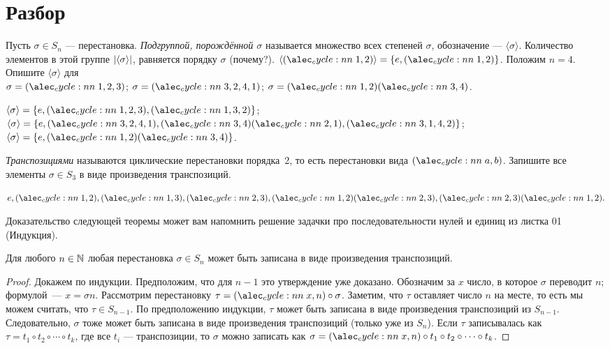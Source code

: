 \documentclass[a4paper,12pt]{article}
\begin{document}
    
    \section{Разбор}
    
     Пусть $\sigma \in S_n$ --- перестановка. \emph{Подгруппой, порождённой $\sigma$} называется множество всех степеней $\sigma$, обозначение --- $\langle\sigma\rangle$. Количество элементов в этой группе $\lvert\langle\sigma\rangle\rvert$, равняется порядку $\sigma$ (почему?).
    \example $\langle\cycle{1,2}\rangle = \{e, \cycle{1,2}\}$.
    \problem  Положим $n = 4$. Опишите $\langle\sigma\rangle$ для \\
    \sub $\sigma = \cycle{1,2,3}$; \sub $\sigma = \cycle{3,2,4,1}$; \sub $\sigma = \cycle{1,2}\cycle{3,4}$.
\begin{solution}
    \sub $\langle\sigma\rangle = \{e, \cycle{1,2,3}, \cycle{1,3,2}\}$; \\
    \sub $\langle\sigma\rangle = \{e, \cycle{3,2,4,1}, \cycle{3,4}\cycle{2,1}, \cycle{3,1,4,2}\}$; \\
    \sub $\langle\sigma\rangle = \{e, \cycle{1,2}\cycle{3,4}\}$.
\end{solution}

     \emph{Транспозициями} называются циклические перестановки порядка~2, то есть перестановки вида $\cycle{a,b}$.
    \problem Запишите все элементы $\sigma \in S_3$ в виде произведения транспозиций.
    \begin{solution}
        $e, \cycle{1,2}, \cycle{1,3}, \cycle{2,3}, \cycle{1,2}\cycle{2,3}, \cycle{2,3}\cycle{1,2}.$
    \end{solution}
    \par Доказательство следующей теоремы может вам напомнить решение задачки про последовательности нулей и единиц из листка 01 (Индукция).
    \begin{theorem} \label{produt_of_transpositions}
        Для любого $n \in \mathbb{N}$ любая перестановка $\sigma \in S_n$ может быть записана в виде произведения транспозиций.
    \end{theorem}
    \begin{proof}
        Докажем по индукции. Предположим, что для $n - 1$ это утверждение уже доказано. Обозначим за $x$ число, в которое $\sigma$ переводит $n$; формулой~--- $x = \sigma n$. Рассмотрим перестановку $\tau = \cycle{x,n} \circ \sigma$. Заметим, что $\tau$ оставляет число $n$ на месте, то есть мы можем считать, что $\tau \in S_{n-1}$. По предположению индукции, $\tau$ может быть записана в виде произведения транспозиций из $S_{n-1}$. Следовательно, $\sigma$ тоже может быть записана в виде произведения транспозиций (только уже из $S_n$). Если $\tau$ записывалась как $\tau = t_1 \circ t_2 \circ \cdots \circ t_k$, где все $t_i$ --- транспозиции, то $\sigma$ можно записать как $\sigma = \cycle{x,n} \circ t_1 \circ t_2 \circ \cdots \circ t_k$. 
    \end{proof}
    
\end{document}
